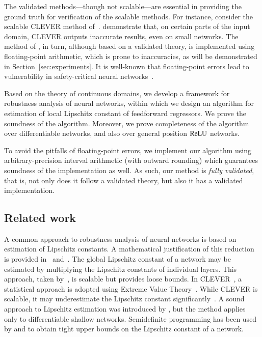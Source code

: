 \documentclass[11pt,times]{article}
\begin{document}
The validated methods---though not scalable---are essential in
providing the ground truth for verification of the scalable
methods. For instance, consider the scalable \ac{CLEVER} method
of~\textcite{Weng_et_al-CLEVER-ICLR:2018}. \textcite{Jordan_Dimakis:Exactly_NeurIPS:2020}
demonstrate that, on certain parts of the input domain, \ac{CLEVER}
outputs inaccurate results, even on small networks. The method of
\textcite{Jordan_Dimakis:Exactly_NeurIPS:2020,Jordan_Dimakis:Provable_ICML:2021},
in turn, although based on a validated theory, is implemented using
floating-point arithmetic, which is prone to inaccuracies, as will be
demonstrated in Section~\ref{sec:experiments}. It is well-known that
floating-point errors lead to vulnerability in safety-critical neural
networks~\parencite{Jia_Rinard:Exploiting_FP:SAS:2021,Zombori:Fooling:ICLR:2021}.

Based on the theory of continuous domains, we develop a framework for
robustness analysis of neural networks, within which we design an
algorithm for estimation of local Lipschitz constant of feedforward
regressors. We prove the soundness of the algorithm. Moreover, we
prove completeness of the algorithm over differentiable networks, and
also over general position $\operatorname{\mathrm{ReLU}}$ networks.

To avoid the pitfalls of floating-point errors, we implement our
algorithm using arbitrary-precision interval arithmetic (with outward
rounding) which guarantees soundness of the implementation as well. As
such, our method is \emph{fully validated}, that is, not only does it
follow a validated theory, but also it has a validated
implementation. 


\subsection{Related work}

A common approach to robustness analysis of neural networks is based
on estimation of Lipschitz constants. A mathematical justification of
this reduction is provided
in~\parencite[Theorem~2.1]{Hein_Andriushchenko:Robustness:2017}
and~\parencite[Theorem~3.2]{Weng_et_al-CLEVER-ICLR:2018}. The global
Lipschitz constant of a network may be estimated by multiplying the
Lipschitz constants of individual layers. This approach, taken
by~\textcite{Szegedy_et_al:Intriguing:2014}, is scalable but provides
loose bounds. In \acs{CLEVER}~\parencite{Weng_et_al-CLEVER-ICLR:2018}, a
statistical approach is adopted using Extreme Value
Theory~\parencite{deHaan_Ferreira:Extreme_Value_Theory:Book:2006}. While
\ac{CLEVER} is scalable, it may underestimate the Lipschitz constant
significantly~\parencite{Jordan_Dimakis:Exactly_NeurIPS:2020}. A sound
approach to Lipschitz estimation was introduced by
\textcite{Hein_Andriushchenko:Robustness:2017}, but the method applies
only to differentiable shallow networks. Semidefinite programming has
been used by \textcite{Fazlyab_et_al:Efficient_Accurate_Lipschitz:2019}
and \textcite{Hashemi_et_al:Certifying_Incremental_Quadratic:2021} to
obtain tight upper bounds on the Lipschitz constant of a network.
\end{document}

